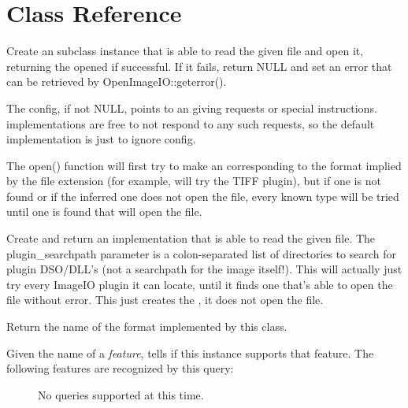 \newpage
\section{\ImageInput Class Reference}
\label{sec:imageinput:reference}

Create an \ImageInput subclass instance that is able to read
the given file and open it, returning the opened \ImageInput if
successful.  If it fails, return {\cf NULL} and set an error that can
be retrieved by {\cf OpenImageIO::geterror()}.
    
The {\cf config}, if not {\cf NULL}, points to an \ImageSpec giving
requests or special instructions.  \ImageInput implementations
are free to not respond to any such requests, so the default
implementation is just to ignore config.
    
The {\cf open()} function will first try to make an \ImageInput
corresponding to the format implied by the file extension (for example,
 will try the TIFF plugin), but if one is not found or if
the inferred one does not open the file, every known \ImageInput type
will be tried until one is found that will open the file.
\apiend


Create and return an \ImageInput implementation that is able
to read the given file.  The {\kw plugin_searchpath} parameter is a
colon-separated list of directories to search for \product plugin
DSO/DLL's (not a searchpath for the image itself!).  This will
actually just try every ImageIO plugin it can locate, until it
finds one that's able to open the file without error.  This just
creates the \ImageInput, it does not open the file.
\apiend

Return the name of the format implemented by this class.
\apiend

\label{sec:inputsupportsfeaturelist}
Given the name of a \emph{feature}, tells if this \ImageInput 
instance supports that feature.  The following features are recognized
by this query:
\begin{description}
\item[\spc] \spc
\item[\rm ] No queries supported at this time.
\end{description}
\apiend

